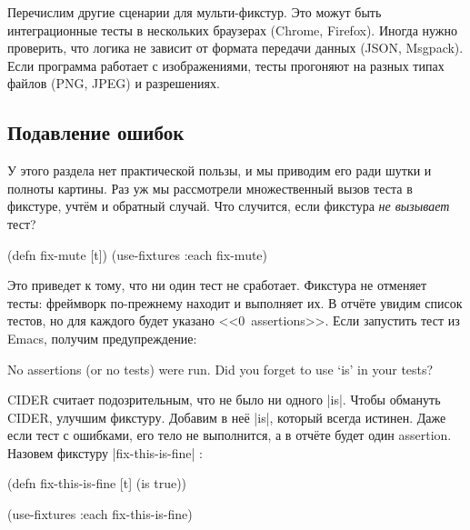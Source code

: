 Перечислим другие сценарии для мульти-фикстур. Это можут быть интеграционные
тесты в нескольких браузерах (Chrome, Firefox). Иногда нужно проверить, что
логика не зависит от формата передачи данных (JSON, Msgpack). Если программа
работает с изображениями, тесты прогоняют на разных типах файлов (PNG, JPEG) и
разрешениях.

\subsection{Подавление ошибок}

У этого раздела нет практической пользы, и мы приводим его ради шутки и полноты
картины. Раз уж мы рассмотрели множественный вызов теста в фикстуре, учт\"{е}м и
обратный случай. Что случится, если фикстура \emph{не вызывает} тест?


\begin{english}
  \begin{clojure}
(defn fix-mute [t])
(use-fixtures :each fix-mute)
  \end{clojure}
\end{english}

Это приведет к тому, что ни один тест не сработает. Фикстура не отменяет тесты:
фреймворк по-прежнему находит и выполняет их. В отч\"{е}те увидим список тестов,
но для каждого будет указано <<0~assertions>>. Если запустить тест из Emacs,
получим предупреждение:

\begin{english}
  \begin{clojure}
No assertions (or no tests) were run.
Did you forget to use ‘is’ in your tests?
  \end{clojure}
\end{english}


CIDER считает подозрительным, что не было ни одного \spverb|is|. Чтобы обмануть
CIDER, улучшим фикстуру. Добавим в не\"{е} \spverb|is|, который всегда истинен. Даже
если тест с ошибками, его тело не выполнится, а в отч\"{е}те будет один
assertion. Назовем фикстуру \spverb|fix-this-is-fine|%
:

\begin{english}
  \begin{clojure}
(defn fix-this-is-fine [t]
  (is true))

(use-fixtures :each fix-this-is-fine)
  \end{clojure}
\end{english}

